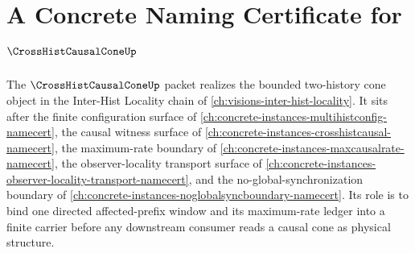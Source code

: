 \chapter{A Concrete Naming Certificate for $\CrossHistCausalConeUp$}
\label{ch:concrete-instances-crosshistcausalcone-namecert}

The $\CrossHistCausalConeUp$ packet realizes the bounded two-history cone object in the Inter-Hist Locality chain of \autoref{ch:visions-inter-hist-locality}. It sits after the finite configuration surface of \autoref{ch:concrete-instances-multihistconfig-namecert}, the causal witness surface of \autoref{ch:concrete-instances-crosshistcausal-namecert}, the maximum-rate boundary of \autoref{ch:concrete-instances-maxcausalrate-namecert}, the observer-locality transport surface of \autoref{ch:concrete-instances-observer-locality-transport-namecert}, and the no-global-synchronization boundary of \autoref{ch:concrete-instances-noglobalsyncboundary-namecert}. Its role is to bind one directed affected-prefix window and its maximum-rate ledger into a finite carrier before any downstream consumer reads a causal cone as physical structure.

